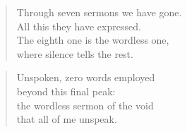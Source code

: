 \documentclass[14pt,a4paper]{article}
\begin{document}
\begin{verse}
Through seven sermons we have gone.\\
All this they have expressed.\\
The eighth one is the wordless one,\\
where silence tells the rest.
\end{verse}

\begin{verse}
Unspoken, zero words employed\\
beyond this final peak:\\
the wordless sermon of the void\\
that all of me unspeak.
\end{verse}
\end{document}
